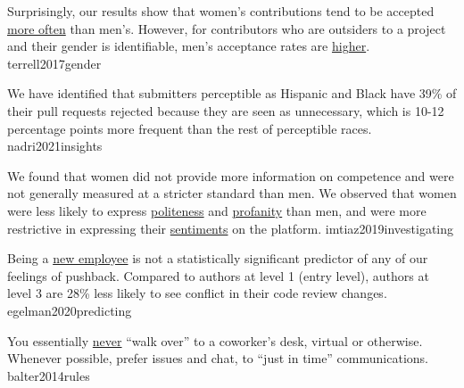 \documentclass{article}
\begin{document}
  {Surprisingly, our results show that women's contributions tend to be accepted \ul{more often} than men's. However, for contributors who are outsiders to a project and their gender is identifiable, men's acceptance rates are \ul{higher}.}
  {terrell2017gender}

  {We have identified that submitters perceptible as Hispanic and Black have 39\% of their pull requests rejected because they are seen as unnecessary, which is 10-12 percentage points more frequent than the rest of perceptible races.}
  {nadri2021insights}

  {We found that women did not provide more information on competence and were not generally measured at a stricter standard than men. We observed that women were less likely to express \ul{politeness} and \ul{profanity} than men, and were more restrictive in expressing their \ul{sentiments} on the platform.}
  {imtiaz2019investigating}

  {Being a \ul{new employee} is not a statistically significant predictor of any of our feelings of pushback. Compared to authors at level 1 (entry level), authors at level 3 are 28\% less likely to see conflict in their code review changes.}
  {egelman2020predicting}



  {You essentially \ul{never} ``walk over'' to a coworker's desk, virtual or otherwise. Whenever possible, prefer issues and chat, to ``just in time'' communications.}
  {balter2014rules}
\end{document}
